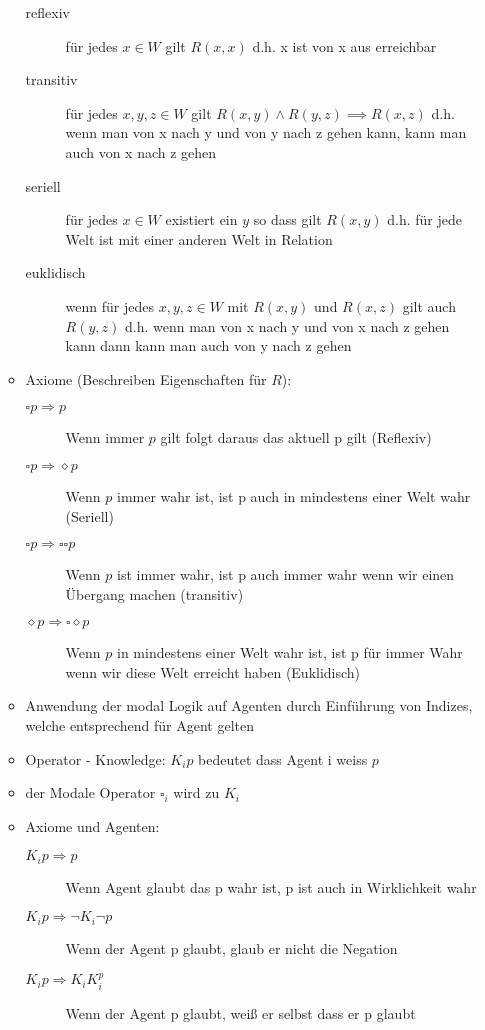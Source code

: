 \documentclass{article} %
\begin{document}
\begin{itemize}
\begin{itemize}
			\begin{description}
				\item[reflexiv] für jedes $x \in W$ gilt $R(x,x)$ d.h. x ist von x aus erreichbar
				\item[transitiv] für jedes $x,y,z \in W$ gilt $R(x,y) \wedge R(y,z) \implies R(x,z)$ d.h. wenn man von x nach y und von y nach z gehen kann, kann man auch von x nach z gehen
				\item[seriell] für jedes $x \in W$ existiert ein $y$ so dass gilt $R(x,y)$ d.h. für jede Welt ist mit einer anderen Welt in Relation
				\item[euklidisch] wenn für jedes $x,y,z \in W$ mit $R(x,y)$ und $R(x,z)$ gilt auch $R(y,z)$ d.h. wenn man von x nach y und von x nach z gehen kann dann kann man auch von y nach z gehen 
			\end{description}
			\item Axiome (Beschreiben Eigenschaften für $R$):
			\begin{description}
				\item[$\square p \Rightarrow p$] Wenn immer $p$ gilt folgt daraus das aktuell p gilt (Reflexiv)
				\item[$\square p \Rightarrow \diamond p$] Wenn $p$ immer wahr ist, ist p auch in mindestens einer Welt wahr (Seriell)
				\item[$\square p \Rightarrow \square \square p$] Wenn $p$ ist immer wahr, ist p auch immer wahr wenn wir einen Übergang machen (transitiv)
				\item[$\diamond p \Rightarrow \square \diamond p$] Wenn $p$ in mindestens einer Welt wahr ist, ist p für immer Wahr wenn wir diese Welt erreicht haben (Euklidisch)
			\end{description}
			\item Anwendung der modal Logik auf Agenten durch Einführung von Indizes, welche entsprechend für Agent gelten
			\item Operator - Knowledge: $K_ip$ bedeutet dass Agent i weiss $p$
			\item der Modale Operator $\square_i$ wird zu $K_i$
			\item Axiome und Agenten:
			\begin{description}
				\item[$K_{i}p \Rightarrow p$] Wenn Agent glaubt das p wahr ist, p ist auch in Wirklichkeit wahr
				\item[$K_{i}p \Rightarrow \neg K_{i}\neg p$] Wenn der Agent p glaubt, glaub er nicht die Negation
				\item[$K_{i}p \Rightarrow K_{i}K_{i}^p$] Wenn der Agent p glaubt, weiß er selbst dass er p glaubt

\end{description}
\end{itemize}
\end{itemize}
\end{document}
